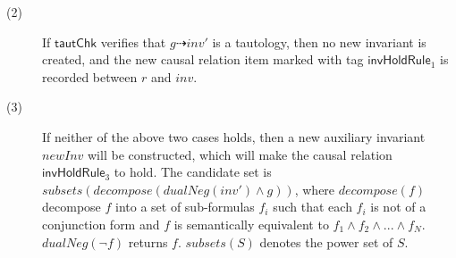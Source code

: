 \documentclass[final]{IEEEtran}
\def \eqc {=}
\def \andc {\wedge }
\def \negc {\lnot}
\begin{document}
{\begin{description}
\item[(2)] If $\mathsf{ tautChk}$ verifies that $g \dashrightarrow inv'$ is a tautology, then  no new invariant is created, and
the new causal relation item marked with tag
$ \mathsf{invHoldRule}_1$ is recorded between $r$ and $inv$. %


\item[(3)] If neither of the above two cases holds, then a new auxiliary invariant $newInv$ will be constructed, which will make the causal relation $ \mathsf{invHoldRule}_3$  to hold. The candidate set is $subsets(decompose(dualNeg(inv')\andc g))$, where $decompose(f)$ decompose $f$ into a set of sub-formulas $f_i$  such that each $f_i$ is not of a conjunction form and $f$   is semantically equivalent to $f_1 \andc f_2 \andc ... \andc f_N$. $dualNeg(\negc f)$ returns $f$. $subsets(S)$ denotes the power set of $S$.

\end{description}}
\end{document}
